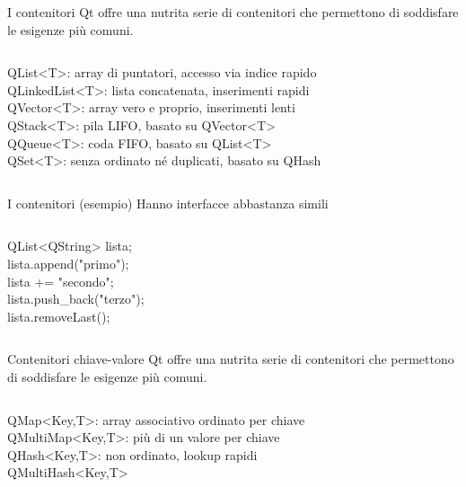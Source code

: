 \documentclass[10pt, aspectratio=169]{beamer}
\begin{document}
\begin{frame}{I contenitori}
	Qt offre una nutrita serie di contenitori che permettono di soddisfare le esigenze più comuni.
	\bigskip
	\begin{columns}
		\begin{block}{}
			{\ttfamily QList<T>}: array di puntatori, accesso via indice rapido\\
			{\ttfamily QLinkedList<T>}: lista concatenata, inserimenti rapidi\\
			{\ttfamily QVector<T>}: array vero e proprio, inserimenti lenti\\
			{\ttfamily QStack<T>}: pila LIFO, basato su {\ttfamily QVector<T>}\\
			{\ttfamily QQueue<T>}: coda FIFO, basato su {\ttfamily QList<T>}\\
			{\ttfamily QSet<T>}: senza ordinato né duplicati, basato su {\ttfamily QHash}
		\end{block}
	\end{columns}
	\bigskip
\end{frame}

\begin{frame}{I contenitori (esempio)}
	Hanno interfacce abbastanza simili
	\bigskip
	\begin{columns}
		\column{0.5\textwidth}
		\begin{block}{}
			{\ttfamily QList<QString> lista;\\
				lista.append("primo");\\
				lista += "secondo";\\
				lista.push\_back("terzo");\\
				lista.removeLast();}
		\end{block}
	\end{columns}
	\bigskip
\end{frame}

\begin{frame}{Contenitori chiave-valore}
	Qt offre una nutrita serie di contenitori che permettono di soddisfare le esigenze più comuni.
	\bigskip
	\begin{columns}
		\column{0.8\textwidth}
		\begin{block}{}
			{\ttfamily QMap<Key,T>}: array associativo ordinato per chiave\\
			{\ttfamily QMultiMap<Key,T>}: più di un valore per chiave\\
			{\ttfamily QHash<Key,T>}: non ordinato, lookup rapidi\\
			{\ttfamily QMultiHash<Key,T>}
		\end{block}
	\end{columns}
\end{frame}
\end{document}
